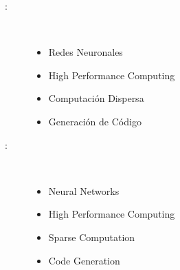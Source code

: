 \begin{multicols}{2}
\begin{description}
\item [\palabraschaveprincipal:] \mbox{} \\[-20pt]
  \begin{itemize}
    \item Redes Neuronales
    \item High Performance Computing
    \item Computación Dispersa
    \item Generación de Código
  \end{itemize}
\end{description}
\begin{description}
\item [\palabraschavesecundaria:] \mbox{} \\[-20pt]
  \begin{itemize}
    \item Neural Networks
    \item High Performance Computing
    \item Sparse Computation
    \item Code Generation
  \end{itemize}
\end{description}
\end{multicols}